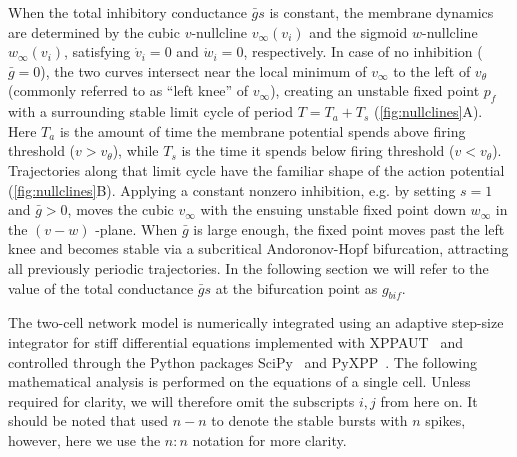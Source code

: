 When the total inhibitory conductance $\bar g s$ is constant, the membrane dynamics are determined by the cubic $v$-nullcline $v_{\infty}(v_i)$ and the sigmoid $w$-nullcline $w_{\infty}(v_{i})$, satisfying $\dot v_{i}=0$ and $\dot w_{i}=0$, respectively.
In case of no inhibition ($\bar g=0$), the two curves intersect near the local minimum of $v_{\infty}$ to the left of $v_{\theta}$ (commonly referred to as ``left knee'' of $v_{\infty}$), creating an unstable fixed point $p_{f}$ with a surrounding stable limit cycle of period $T=T_{a}+T_{s}$ (\cref{fig:nullclines}A).
Here $T_{a}$ is the amount of time the membrane potential spends above firing threshold ($v>v_\theta$), while $T_{s}$ is the time it spends below firing threshold ($v<v_\theta$). Trajectories along that limit cycle have the familiar shape of the action potential (\cref{fig:nullclines}B).
Applying a constant nonzero inhibition, e.g. by setting $s=1$ and $\bar g > 0$, moves the cubic $v_{\infty}$ with the ensuing unstable fixed point down $w_{\infty}$ in the $(v-w)$ -plane.
When $\bar g$ is large enough, the fixed point moves past the left knee and becomes stable via a subcritical Andoronov-Hopf bifurcation, attracting all previously periodic trajectories.
In the following section we will refer to the value of the total conductance $\bar g s$ at the bifurcation point as $g_{bif}$.

The two-cell network model is numerically integrated using an adaptive step-size integrator for stiff differential equations implemented with XPPAUT~\citep{ermentrout2002} and controlled through the Python packages SciPy~\citep{scipy2020} and PyXPP~\citep{pyxpp}.
The following mathematical analysis is performed on the equations of a single cell.
Unless required for clarity, we will therefore omit the subscripts $i,j$ from here on.
It should be noted that \citep{bose2011} used $n-n$ to denote the stable bursts with $n$ spikes, however, here we use the $n:n$ notation for more clarity.

